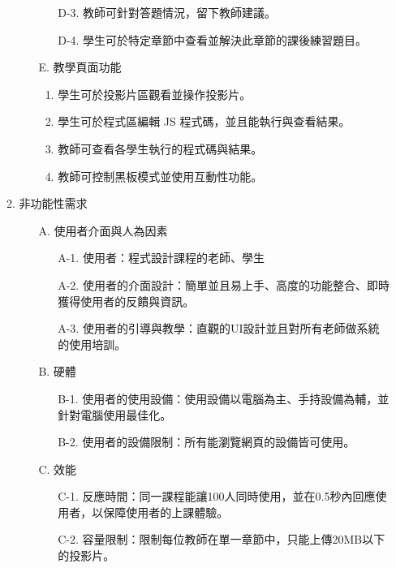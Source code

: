 \documentclass[12pt]{article}
\begin{document}
\begin{enumerate}
\begin{enumerate}
\begin{enumerate}[itemindent=12pt]
\begin{enumerate}[itemindent=24pt]
              \item [D-3.] 教師可針對答題情況，留下教師建議。
              \item [D-4.] 學生可於特定章節中查看並解決此章節的課後練習題目。
            \end{enumerate}
          \item [E.] 教學頁面功能
            \begin{enumerate}[itemindent=24pt, label=E-\arabic*.]
              \item 學生可於投影片區觀看並操作投影片。
              \item 學生可於程式區編輯 JS 程式碼，並且能執行與查看結果。
              \item 教師可查看各學生執行的程式碼與結果。
              \item 教師可控制黑板模式並使用互動性功能。
            \end{enumerate}
          \end{enumerate}
      \item 非功能性需求
        \begin{enumerate}[itemindent=12pt]
          \item [A.] 使用者介面與人為因素
          \begin{enumerate}[itemindent=24pt]
            \item [A-1.] 使用者：程式設計課程的老師、學生
            \item [A-2.] 使用者的介面設計：簡單並且易上手、高度的功能整合、即時獲得使用者的反饋與資訊。
            \item [A-3.] 使用者的引導與教學：直觀的UI設計並且對所有老師做系統的使用培訓。
          \end{enumerate}
          \item [B.] 硬體
            \begin{enumerate}[itemindent=24pt]
              \item [B-1.] 使用者的使用設備：使用設備以電腦為主、手持設備為輔，並針對電腦使用最佳化。
              \item [B-2.] 使用者的設備限制：所有能瀏覽網頁的設備皆可使用。
            \end{enumerate}
          \item [C.] 效能
            \begin{enumerate}[itemindent=24pt]
              \item [C-1.] 反應時間：同一課程能讓100人同時使用，並在0.5秒內回應使用者，以保障使用者的上課體驗。
              \item [C-2.] 容量限制：限制每位教師在單一章節中，只能上傳20MB以下的投影片。

\end{enumerate}
\end{enumerate}
\end{enumerate}
\end{enumerate}
\end{document}
